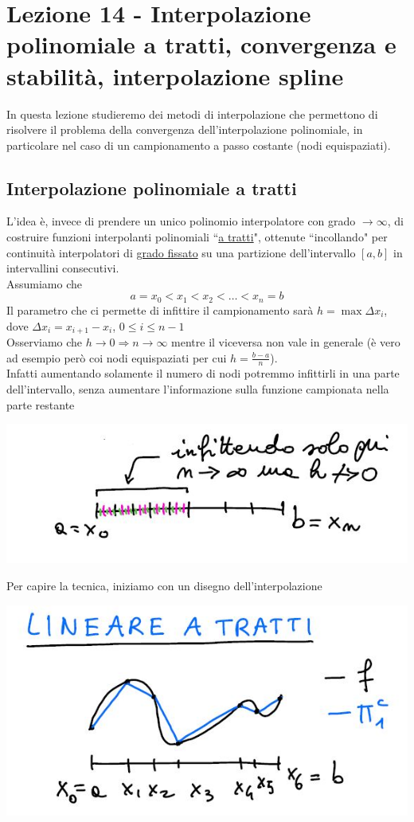 \section[Lezione 14 - Interpolazione polinomiale a tratti]{Lezione 14 - Interpolazione polinomiale a tratti, convergenza e stabilità, interpolazione spline}
In questa lezione studieremo dei metodi di interpolazione che permettono di risolvere il problema della convergenza dell'interpolazione polinomiale, in particolare nel caso di un campionamento a passo costante (nodi equispaziati).

\subsection{Interpolazione polinomiale a tratti}
L'idea è, invece di prendere un unico polinomio interpolatore
con grado $\rightarrow\infty$, di costruire funzioni interpolanti polinomiali ``\uline{a tratti}", ottenute ``incollando" per continuità interpolatori di \uline{grado fissato} su una partizione dell'intervallo $[a,b]$ in intervallini consecutivi.\\ 
Assumiamo che 
\[ a=x_0<x_1<x_2<\dotso<x_n=b \]
Il parametro che ci permette di infittire il campionamento sarà $h=\max\Delta x_i$, dove $\Delta x_i= x_{i+1}-x_i$, $0\leq i\leq n-1$\\
Osserviamo che $h\rightarrow0\Rightarrow n\rightarrow\infty$ mentre il viceversa non vale in generale (è vero ad esempio però coi nodi equispaziati per cui $h=\frac{b-a}{n}$).\\ 
Infatti aumentando solamente il numero di nodi potremmo infittirli in una parte dell'intervallo, senza aumentare l'informazione sulla funzione campionata nella parte restante
\begin{center}
    \includegraphics[scale=0.5]{foto/calcolo}
\end{center}
Per capire la tecnica, iniziamo con un disegno dell'interpolazione
\begin{center}
    \includegraphics[scale=0.5]{foto/calcolo2}
\end{center}
